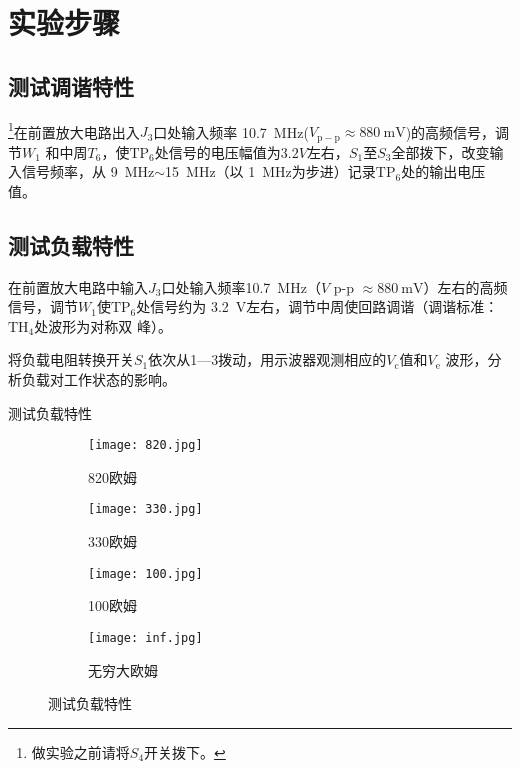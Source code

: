 \documentclass[../main]{subfiles}
\begin{document}
\section{实验步骤}%
\label{sec:\arabic{chapter}实验步骤}

\subsection{测试调谐特性}%
\label{sub:测试调谐特性}

\footnote{做实验之前请将$ S_4 $开关拨下。}在前置放大电路出入$ J_3 $口处输入频率
\SI{10.7}{\MHz}($ V_\mathrm{p-p}\approx \SI{880}{\mV} $)的高频信号，调节$ W_1 $
和中周$ T_6 $，使$ \mathrm{TP}_6 $处信号的电压幅值为$ 3.2V $左右，$ S_1 $至$ S_3
$全部拨下，改变输入信号频率，从 \SI{9}{\MHz}$ \sim $\SI{15}{\MHz}（以
\SI{1}{\MHz}为步进）记录$ \mathrm{TP}_6 $处的输出电压值。

\subsection{测试负载特性}%
\label{sub:测试负载特性}

在前置放大电路中输入$ J_3 $口处输入频率\SI{10.7}{\MHz}（$ V$ p-p $\approx
\SI{880}{\mV} $）左右的高频信号，调节$ W_1 $使$ \mathrm{TP}_6 $处信号约为
\SI{3.2}{\V}左右，调节中周使回路调谐（调谐标准：$ \mathrm{TH}_4 $处波形为对称双
峰）。

将负载电阻转换开关$ S_1 $依次从1—3拨动，用示波器观测相应的$ V_\mathrm{c} $值和$
V_\mathrm{e} $ 波形，分析负载对工作状态的影响。

\begin{table}[htbp]
	\centering
	\caption{测试负载特性}
	\label{tab:测试负载特性}
\end{table}

\begin{figure}[htbp]
	\centering
	\begin{subfigure}[htbp]{.45\linewidth}
		\centering
		\texttt{[image: 820.jpg]}
		\caption{820欧姆}
		\label{fig:820欧姆}
	\end{subfigure}
	\quad
	\begin{subfigure}[htbp]{.45\linewidth}
		\centering
		\texttt{[image: 330.jpg]}
		\caption{330欧姆}
		\label{fig:330欧姆}
	\end{subfigure}

	\begin{subfigure}[htbp]{.45\linewidth}
		\centering
		\texttt{[image: 100.jpg]}
		\caption{100欧姆}
		\label{fig:100欧姆}
	\end{subfigure}
	\quad
	\begin{subfigure}[htbp]{.45\linewidth}
		\centering
		\texttt{[image: inf.jpg]}
		\caption{无穷大欧姆}
		\label{fig:无穷大欧姆}
	\end{subfigure}
	\caption{测试负载特性}
	\label{fig:测试负载特性}
\end{figure}
\end{document}
